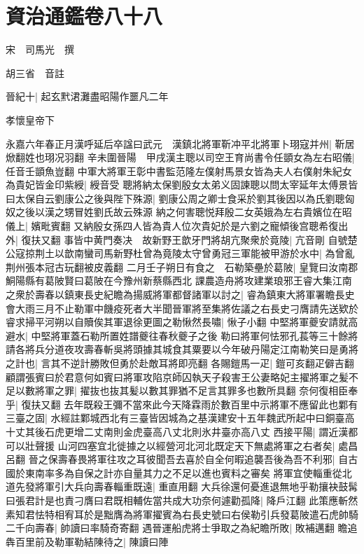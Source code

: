 \section{資治通鑑卷八十八}
宋　司馬光　撰

胡三省　音註

晉紀十|{
	起玄黓涒灘盡昭陽作噩凡二年}


孝懷皇帝下

永嘉六年春正月漢呼延后卒諡曰武元　漢鎮北將軍靳冲平北將軍卜珝寇并州|{
	靳居焮翻姓也珝况羽翻}
辛未圍晉陽　甲戌漢主聰以司空王育尚書令任顗女為左右昭儀|{
	任音壬顗魚豈翻}
中軍大將軍王彰中書監范隆左僕射馬景女皆為夫人右僕射朱紀女為貴妃皆金印紫綬|{
	綬音受}
聰將納太保劉殷女太弟义固諫聰以問太宰延年太傅景皆曰太保自云劉康公之後與陛下殊源|{
	劉康公周之卿士食采於劉其後因以為氏劉聰匈奴之後以漢之甥冒姓劉氏故云殊源}
納之何害聰悦拜殷二女英娥為左右貴嬪位在昭儀上|{
	嬪毗賓翻}
又納殷女孫四人皆為貴人位次貴妃於是六劉之寵傾後宫聰希復出外|{
	復扶又翻}
事皆中黄門奏决　故新野王歆牙門將胡亢聚衆於竟陵|{
	亢音剛}
自號楚公寇掠荆土以歆南蠻司馬新野杜曾為竟陵太守曾勇冠三軍能被甲游於水中|{
	為曾亂荆州張本冠古玩翻被皮義翻}
二月壬子朔日有食之　石勒築壘於葛陂|{
	皇覽曰汝南郡鮦陽縣有葛陂賢曰葛陂在今豫州新蔡縣西北}
課農造舟將攻建業琅邪王睿大集江南之衆於壽春以鎮東長史紀瞻為揚威將軍都督諸軍以討之|{
	睿為鎮東大將軍署瞻長史}
會大雨三月不止勒軍中饑疫死者大半聞晉軍將至集將佐議之右長史刁膺請先送欵於睿求掃平河朔以自贖俟其軍退徐更圖之勒愀然長嘯|{
	愀子小翻}
中堅將軍夔安請就高避水|{
	中堅將軍蓋石勒所置姓譜夔往春秋夔子之後}
勒曰將軍何怯邪孔萇等三十餘將請各將兵分道夜攻壽春斬吳將頭據其城食其粟要以今年破丹陽定江南勒笑曰是勇將之計也|{
	言其不逆計勝敗但勇於赴敵耳將即亮翻}
各賜鎧馬一疋|{
	鎧可亥翻疋僻吉翻}
顧謂張賓曰於君意何如賓曰將軍攻陷京師囚執天子殺害王公妻略妃主擢將軍之髪不足以數將軍之罪|{
	擢抜也抜其髪以數其罪猶不足言其罪多也數所具翻}
奈何復相臣奉乎|{
	復扶又翻}
去年既殺王彌不當來此今天降霖雨於數百里中示將軍不應留此也鄴有三臺之固|{
	水經註鄴城西北有三臺皆因城為之基漢建安十五年魏武所起中曰銅臺高十丈其後石虎更增二丈南則金虎臺高八丈北則氷井臺亦高八丈}
西接平陽|{
	謂近漢都可以壯聲援}
山河四塞宜北徙據之以經營河北河北既定天下無處將軍之右者矣|{
	處昌呂翻}
晉之保壽春畏將軍往攻之耳彼聞吾去喜於自全何暇追襲吾後為吾不利邪|{
	自古國於東南率多為自保之計亦自量其力之不足以進也賓料之審矣}
將軍宜使輜重從北道先發將軍引大兵向壽春輜重既遠|{
	重直用翻}
大兵徐還何憂進退無地乎勒攘袂鼓髯曰張君計是也責刁膺曰君既相輔佐當共成大功奈何遽勸孤降|{
	降戶江翻}
此策應斬然素知君怯特相宥耳於是黜膺為將軍擢賓為右長史號曰右侯勒引兵發葛陂遣石虎帥騎二千向壽春|{
	帥讀曰率騎奇寄翻}
遇晉運船虎將士爭取之為紀瞻所敗|{
	敗補邁翻}
瞻追犇百里前及勒軍勒結陳待之|{
	陳讀曰陣}
